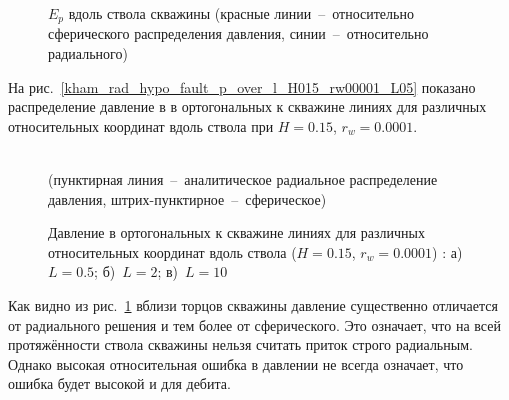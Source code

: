 \documentclass{article}
\begin{document}
\begin{figure}[h!]
\caption{$E_p$ вдоль ствола скважины (красные линии~--~относительно сферического распределения давления,
синии~--~относительно радиального)}
\label{fig:kham_rad_hypo_fault_p_over_l}
\end{figure}

На рис.~\ref{kham_rad_hypo_fault_p_over_l_H015_rw00001_L05} показано распределение давление в
в ортогональных к скважине линиях для различных относительных координат вдоль ствола при $H=0.15$, $r_w = 0.0001$.

\begin{figure}[h!]
\centering
\begin{subfigure}{0.3\textwidth}

\caption{}
\label{fig:kham_py_L05_rw0001_H015_mgrp}
\end{subfigure}
\hfill
\begin{subfigure}{0.3\textwidth}

\caption{}
\label{fig:kham_py_L2_rw0001_H015_mgrp}
\end{subfigure}
\hfill
\begin{subfigure}{0.3\textwidth}

\caption{}
\label{fig:kham_py_L10_rw0001_H015_mgrp}
\end{subfigure}

\caption{Давление в ортогональных к скважине линиях для различных относительных координат вдоль ствола
($H=0.15$, $r_w = 0.0001$) : а)~$L=0.5$; б)~$L=2$; в)~$L=10$} \\
(пунктирная линия~--~аналитическое радиальное распределение давления, штрих-пунктирное~--~сферическое)
\label{fig:kham_rad_hypo_fault_p_over_l_H015_rw00001_L05}
\end{figure}

Как видно из рис.~\ref{fig:kham_rad_hypo_fault_p_over_l} вблизи торцов скважины давление существенно отличается от радиального решения и тем более от сферического.
Это означает, что на всей протяжённости ствола скважины нельзя считать приток строго радиальным.
Однако высокая относительная ошибка в давлении не всегда означает, что ошибка будет высокой и для дебита.
\end{document}
